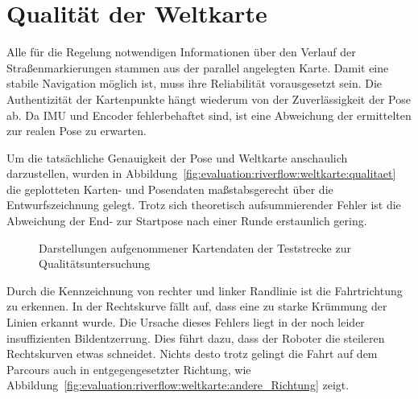\section{Qualität der Weltkarte \dcfirstauthorshort}
\label{ssec:evaluation:messungen:weltkarte}
Alle für die Regelung notwendigen Informationen über den Verlauf der Straßenmarkierungen stammen aus der parallel angelegten Karte. Damit eine stabile Navigation möglich ist, muss ihre Reliabilität vorausgesetzt sein. Die Authentizität der Kartenpunkte hängt wiederum von der Zuverlässigkeit der Pose ab. Da IMU und Encoder fehlerbehaftet sind, ist eine Abweichung der ermittelten zur realen Pose zu erwarten. 

Um die tatsächliche Genauigkeit der Pose und Weltkarte anschaulich darzustellen, wurden in Abbildung~\ref{fig:evaluation:riverflow:weltkarte:qualitaet} die geplotteten Karten- und Posendaten maßstabsgerecht über die Entwurfszeichnung gelegt. Trotz sich theoretisch aufsummierender Fehler ist die Abweichung der End- zur Startpose nach einer Runde erstaunlich gering.

\begin{figure}[htbp] %
	\centering
	
	\hfill
	\caption{Darstellungen aufgenommener Kartendaten der Teststrecke zur Qualitätsuntersuchung}
	
\end{figure} 

Durch die Kennzeichnung von rechter und linker Randlinie ist die Fahrtrichtung zu erkennen. In der Rechtskurve fällt auf, dass eine zu starke Krümmung der Linien erkannt wurde. Die Ursache dieses Fehlers liegt in der noch leider insuffizienten Bildentzerrung. Dies führt dazu, dass der Roboter die steileren Rechtskurven etwas schneidet. Nichts desto trotz gelingt die Fahrt auf dem Parcours auch in entgegengesetzter Richtung, wie Abbildung~\ref{fig:evaluation:riverflow:weltkarte:andere_Richtung} zeigt.